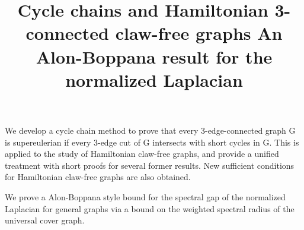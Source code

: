 \documentclass{article}
\begin{document}
%
%
%


\vspace{.25in}

\title{ Cycle chains and Hamiltonian 3-connected claw-free graphs}
\endtitle
We develop a cycle chain method to prove that every
3-edge-connected graph G is supereulerian if every 3-edge cut of G
intersects with short cycles in G. This is applied to the study of
Hamiltonian claw-free graphs, and provide a unified treatment with short
proofs for several former results. New sufficient conditions for Hamiltonian
claw-free graphs are also obtained. 



\vspace{.25in}

\title{ An Alon-Boppana result for the normalized Laplacian}
\endtitle
We prove a Alon-Boppana style bound for the spectral gap of the normalized
Laplacian for general graphs via a bound on the weighted spectral radius of
the universal cover graph.
\end{document}
